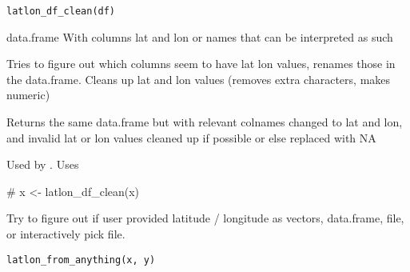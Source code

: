 \documentclass[a4paper]{book}
\begin{document}
%
\begin{Usage}
\begin{verbatim}
latlon_df_clean(df)
\end{verbatim}
\end{Usage}
%
\begin{Arguments}
\begin{ldescription}
\item[\code{df}] data.frame With columns lat and lon or names that can be interpreted as such
\end{ldescription}
\end{Arguments}
%
\begin{Details}\relax
Tries to figure out which columns seem to have lat lon values, renames those in the data.frame.
Cleans up lat and lon values (removes extra characters, makes numeric)
\end{Details}
%
\begin{Value}
Returns the same data.frame but with relevant colnames changed to lat and lon,
and invalid lat or lon values cleaned up if possible or else replaced with NA
\end{Value}
%
\begin{SeeAlso}\relax
Used by . Uses   
\end{SeeAlso}
%
\begin{Examples}
\begin{ExampleCode}
#  x <- latlon_df_clean(x)
\end{ExampleCode}
\end{Examples}
%
\begin{Description}\relax
Try to figure out if user provided latitude / longitude as vectors, data.frame, file, or interactively pick file.
\end{Description}
%
\begin{Usage}
\begin{verbatim}
latlon_from_anything(x, y)
\end{verbatim}
\end{Usage}
\end{document}
